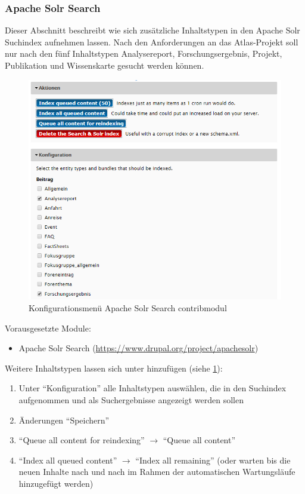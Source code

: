 \subsubsection{Apache Solr Search}\label{subsub:apachesolr}
Dieser Abschnitt beschreibt wie sich zusätzliche Inhaltstypen in den Apache Solr Suchindex aufnehmen lassen. Nach den Anforderungen an das Atlas-Projekt soll nur nach den fünf Inhaltstypen Analysereport, Forschungsergebnis, Projekt, Publikation und Wissenskarte gesucht werden können. 

\begin{figure}[H]
	\centering
	\includegraphics[height=0.20\textheight]{images/config_apachesolr}
	\caption{Konfigurationsmenü Apache Solr Search \gls{contribmodul}}
	\label{fig:config_apachesolr}
\end{figure}

Vorausgesetzte Module:
\begin{itemize}
	\item Apache Solr Search (\url{https://www.drupal.org/project/apachesolr})
\end{itemize}

Weitere Inhaltstypen lassen sich unter  hinzufügen (siehe \cref{fig:config_apachesolr}):
\begin{enumerate}[parsep=0pt, itemsep=5.0pt plus 2.0pt minus 1.0pt]
	\item Unter \enquote{Konfiguration} alle Inhaltstypen auswählen, die in den Suchindex aufgenommen und als Suchergebnisse angezeigt werden sollen
	\item Änderungen \enquote{Speichern}
	\item \enquote{Queue all content for reindexing} $\rightarrow$ \enquote{Queue all content}
	\item \enquote{Index all queued content} $\rightarrow$ \enquote{Index all remaining} (oder warten bis die neuen Inhalte nach und nach im Rahmen der automatischen Wartungsläufe hinzugefügt werden)
\end{enumerate}





